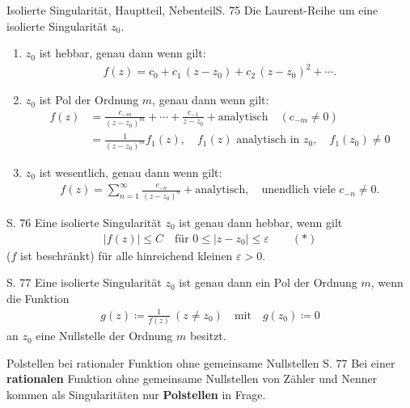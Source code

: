 \begin{bemerkung}{Isolierte Singularität, Hauptteil, Nebenteil}{S. 75}
  Die Laurent-Reihe um eine isolierte Singularität $z_0$.
  \begin{enumerate}[label=\alph*)]
    \item $z_0$ ist hebbar, genau dann wenn gilt:
      \begin{align}
        f(z) = c_0 + c_1\,(z-z_0) + c_2\,(z-z_0)^2 + \cdots .
      \end{align}
    \item $z_0$ ist Pol der Ordnung $m$, genau dann wenn gilt:
      \begin{align}
        f(z)
        &= \frac{c_{-m}}{(z-z_0)^m} + \cdots + \frac{c_{-1}}{z-z_0} + \text{analytisch} \quad (c_{-m} \neq 0) \\
        &= \frac{1}{(z-z_0)^m} f_1(z), \quad f_1(z) \text{ analytisch in } z_0, \quad f_1(z_0) \neq 0
      \end{align}
    \item $z_0$ ist wesentlich, genau dann wenn gilt:
      \begin{align}
        f(z) = \sum_{n=1}^{\infty} \frac{c_{-n}}{(z-z_0)^n} + \text{analytisch}, \quad \text{unendlich viele } c_{-n} \neq 0.
      \end{align}
  \end{enumerate}
\end{bemerkung}

\begin{satz}{S. 76}
  \label{satz:7_2}
  Eine isolierte Singularität $z_0$ ist genau dann hebbar, wenn gilt
  \begin{align}
    \left| f(z) \right| \leq C \quad \text{für } 0 \leq | z-z_0| \leq \varepsilon \qquad (*)
  \end{align}
  ($f$ ist beschränkt) für alle hinreichend kleinen $\varepsilon > 0$.
\end{satz}

\begin{satz}{S. 77}
  \label{satz:7_3}
  Eine isolierte Singularität $z_0$ ist genau dann ein Pol der Ordnung $m$, wenn die Funktion
  \begin{align}
    g(z) \coloneqq \frac{1}{f(z)} \ (z \neq z_0) \quad \text{mit} \quad g(z_0) \coloneqq 0
  \end{align}
  an $z_0$ eine Nullstelle der Ordnung $m$ besitzt.
\end{satz}

\begin{bemerkung}{Polstellen bei rationaler Funktion ohne gemeinsame Nullstellen }{S. 77}
  Bei einer \textbf{rationalen} Funktion ohne gemeinsame Nullstellen von Zähler und Nenner kommen als Singularitäten nur \textbf{Polstellen} in Frage.
\end{bemerkung}

